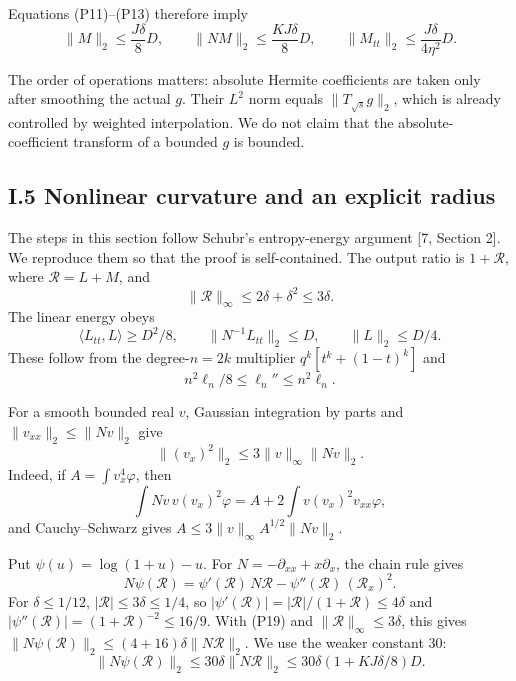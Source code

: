 \documentclass[
  british,
  10pt,
]{article}
\begin{document}
Equations (P11)--(P13) therefore imply \[
\|M\|_2\le\frac{J\delta}{8}D,\qquad
\|NM\|_2\le\frac{KJ\delta}{8}D,\qquad
\|M_{tt}\|_2\le\frac{J\delta}{4\eta^2}D.                 \tag{P17}
\]

The order of operations matters: absolute Hermite coefficients are taken
only after smoothing the actual \(g\). Their \(L^2\) norm equals
\(\|T_{\sqrt s}g\|_2\), which is already controlled by weighted
interpolation. We do not claim that the absolute-coefficient transform
of a bounded \(g\) is bounded.

\subsection{I.5 Nonlinear curvature and an explicit
radius}\label{i.5-nonlinear-curvature-and-an-explicit-radius}

The steps in this section follow Schubr's entropy-energy argument {[}7,
Section 2{]}. We reproduce them so that the proof is self-contained. The
output ratio is \(1+\mathcal R\), where \(\mathcal R=L+M\), and \[
\|\mathcal R\|_\infty\le2\delta+\delta^2\le3\delta.
\] The linear energy obeys \[
\langle L_{tt},L\rangle\ge D^2/8,\qquad
\|N^{-1}L_{tt}\|_2\le D,\qquad \|L\|_2\le D/4.           \tag{P18}
\] These follow from the degree-\(n=2k\) multiplier \(q^k[t^k+(1-t)^k]\)
and \[
n^2\ell_n/8\le\ell_n''\le n^2\ell_n.
\]

For a smooth bounded real \(v\), Gaussian integration by parts and
\(\|v_{xx}\|_2\le\|Nv\|_2\) give \[
\|(v_x)^2\|_2\le3\|v\|_\infty\|Nv\|_2.                  \tag{P19}
\] Indeed, if \(A=\int v_x^4\varphi\), then \[
\int Nv\,v(v_x)^2\varphi
=A+2\int v(v_x)^2v_{xx}\varphi,
\] and Cauchy--Schwarz gives \(A\le3\|v\|_\infty A^{1/2}\|Nv\|_2\).

Put \(\psi(u)=\log(1+u)-u\). For \(N=-\partial_{xx}+x\partial_x\), the
chain rule gives \[
N\psi(\mathcal R)=\psi'(\mathcal R)\,N\mathcal R-\psi''(\mathcal R)\,(\mathcal R_x)^2 .
\] For \(\delta\le1/12\), \(|\mathcal R|\le3\delta\le1/4\), so
\(|\psi'(\mathcal R)|=|\mathcal R|/(1+\mathcal R)\le4\delta\) and
\(|\psi''(\mathcal R)|=(1+\mathcal R)^{-2}\le16/9\). With (P19) and
\(\|\mathcal R\|_\infty\le3\delta\), this gives
\(\|N\psi(\mathcal R)\|_2\le(4+16)\delta\|N\mathcal R\|_2\). We use the
weaker constant \(30\): \[
\|N\psi(\mathcal R)\|_2
\le30\delta\|N\mathcal R\|_2
\le30\delta(1+KJ\delta/8)D.                             \tag{P20}
\]
\end{document}
